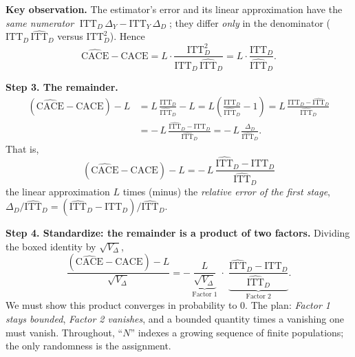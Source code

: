 \documentclass[11pt]{article}
\newcommand{\ITTY}{\mathrm{ITT}_Y}
\newcommand{\ITTD}{\mathrm{ITT}_D}
\newcommand{\CACE}{\mathrm{CACE}}
\newcommand{\hITTD}{\widehat{\mathrm{ITT}}_D}
\newcommand{\hCACE}{\widehat{\mathrm{CACE}}}
\begin{document}
\bigskip
\noindent\textbf{Key observation.}
The estimator's error and its linear approximation have the \emph{same numerator}
$\;\ITTD\,\Delta_Y - \ITTY\,\Delta_D\;$; they differ \emph{only} in the
denominator ($\ITTD\,\hITTD$ versus $\ITTD^{2}$). Hence
\begin{equation*}
\hCACE - \CACE
= L \cdot \frac{\ITTD^{2}}{\ITTD\,\hITTD}
= L \cdot \frac{\ITTD}{\hITTD}.
\end{equation*}

\bigskip
\noindent\textbf{Step 3. The remainder.}
\begin{align*}
\left(\hCACE - \CACE\right) - L
&= L\,\frac{\ITTD}{\hITTD} - L
= L\left(\frac{\ITTD}{\hITTD} - 1\right)
= L\,\frac{\ITTD - \hITTD}{\hITTD} \\[4pt]
&= -\,L\,\frac{\hITTD - \ITTD}{\hITTD}
= -\,L\,\frac{\Delta_D}{\hITTD}.
\end{align*}
That is,
\begin{equation*}
\boxed{\;\left(\hCACE - \CACE\right) - L
= -\,L\,\frac{\hITTD - \ITTD}{\hITTD}\;}
\end{equation*}
the linear approximation $L$ times (minus) the \emph{relative error of the first
stage}, $\Delta_D/\hITTD = (\hITTD - \ITTD)/\hITTD$.

\bigskip
\noindent\textbf{Step 4. Standardize: the remainder is a product of two factors.}
Dividing the boxed identity by $\sqrt{V_\Delta}$,
\begin{equation*}
\frac{\left(\hCACE - \CACE\right) - L}{\sqrt{V_\Delta}}
= -\,\underbrace{\frac{L}{\sqrt{V_\Delta}}}_{\textstyle \text{Factor 1}}
\;\cdot\;
\underbrace{\frac{\hITTD - \ITTD}{\hITTD}}_{\textstyle \text{Factor 2}} .
\end{equation*}
We must show this product converges in probability to $0$. The plan: \emph{Factor 1
stays bounded}, \emph{Factor 2 vanishes}, and a bounded quantity times a vanishing
one must vanish. Throughout, ``$N$'' indexes a growing sequence of finite
populations; the only randomness is the assignment.
\end{document}
